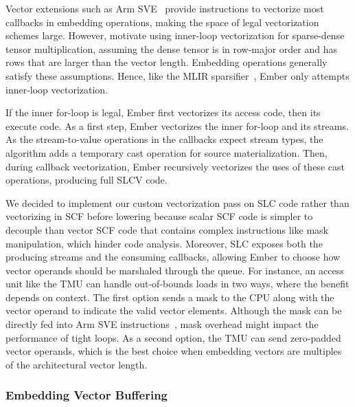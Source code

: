 Vector extensions such as Arm SVE~\cite{stephens2017micro} provide instructions to vectorize most callbacks in embedding operations, making the space of legal vectorization schemes large. However,  motivate using inner-loop vectorization for sparse-dense tensor multiplication, assuming the dense tensor is in row-major order and has rows that are larger than the vector length. Embedding operations generally satisfy these assumptions. Hence, like the MLIR sparsifier~\cite{bik2022taco}, Ember only attempts inner-loop vectorization.

If the inner for-loop is legal, Ember first vectorizes its access code, then its execute code. As a first step, Ember vectorizes the inner for-loop and its streams. As the stream-to-value operations in the callbacks expect stream types, the algorithm adds a temporary cast operation for source materialization. Then, during callback vectorization, Ember recursively vectorizes the uses of these cast operations, producing full SLCV code. %

We decided to implement our custom vectorization pass on SLC code rather than vectorizing in SCF before lowering because scalar SCF code is simpler to decouple than vector SCF code that contains complex instructions like mask manipulation, which hinder code analysis. Moreover, SLC exposes both the producing streams and the consuming callbacks, allowing Ember to choose how vector operands should be marshaled through the queue. For instance, an access unit like the TMU can handle out-of-bounds loads in two ways, where the benefit depends on context. The first option sends a mask to the CPU along with the vector operand to indicate the valid vector elements. Although the mask can be directly fed into Arm SVE instructions~\cite{stephens2017micro}, mask overhead might impact the performance of tight loops. As a second option, the TMU can send zero-padded vector operands, which is the best choice when embedding vectors are multiples of the architectural vector length.

\subsubsection{Embedding Vector Buffering} \label{sec:embedding-vector-buffering} %

